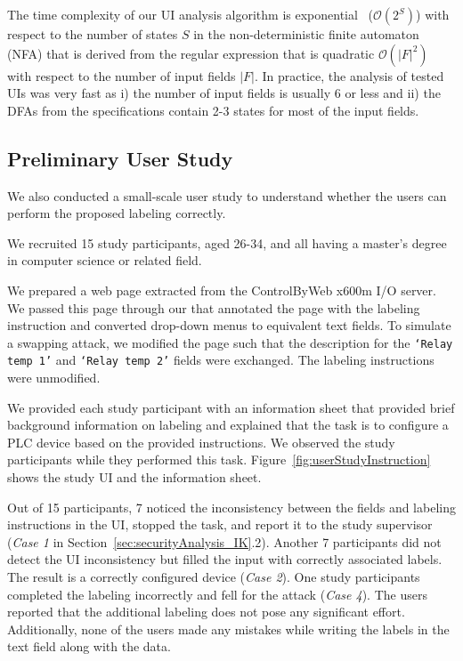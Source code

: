 The time complexity of our UI analysis algorithm is exponential~\cite{Salomaa1997} ($\mathcal{O}(2^S)$) with respect to the number of states $S$ in the non-deterministic finite automaton (NFA) that is derived from the regular expression that is quadratic $\mathcal{O}(|F|^2)$ with respect to the number of input fields $|F|$. In practice, the analysis of tested UIs was very fast as i) the number of input fields is usually $6$ or less and ii) the DFAs from the specifications contain 2-3 states for most of the input fields.



\subsection{Preliminary User Study}
\label{sec:results:userStudy}

We also conducted a small-scale user study to understand whether the users can perform the proposed labeling correctly. 

 We recruited 15 study participants, aged 26-34, and all having a master's degree in computer science or related field.

 We prepared a web page extracted from the ControlByWeb x600m I/O server. We passed this page through our \tool that annotated the page with the labeling instruction and converted drop-down menus to equivalent text fields. To simulate a swapping attack, we modified the page such that the description for the \texttt{`Relay temp 1'} and \texttt{`Relay temp 2'} fields were exchanged. The labeling instructions were unmodified.

We provided each study participant with an information sheet that provided brief background information on labeling and explained that the task is to configure a PLC device based on the provided instructions. We observed the study participants while they performed this task. 
Figure~\ref{fig:userStudyInstruction} shows the study UI and the information sheet.

 Out of 15 participants, 7 noticed the inconsistency between the fields and labeling instructions in the UI, stopped the task, and report it to the study supervisor (\emph{Case 1} in Section~\ref{sec:securityAnalysis_IK}.2). Another 7 participants did not detect the UI inconsistency but filled the input with correctly associated labels. The result is a correctly configured device (\emph{Case 2}). One study participants completed the labeling incorrectly and fell for the attack (\emph{Case 4}). The users reported that the additional labeling does not pose any significant effort. Additionally, none of the users made any mistakes while writing the labels in the text field along with the data. 


